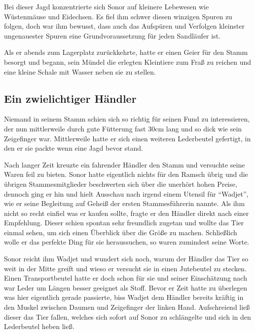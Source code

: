 \documentclass[a4paper]{scrreprt}
\begin{document}
	Bei dieser Jagd konzentrierte sich Sonor auf kleinere Lebewesen wie Wüstenmäuse und Eidechsen. Es fiel ihm schwer diesen winzigen Spuren zu folgen, doch war ihm bewusst, dass auch das Aufspüren und Verfolgen kleinster ungenauester Spuren eine Grundvoraussetzung für jeden Sandläufer ist.
	
	Als er abends zum Lagerplatz zurückkehrte, hatte er einen Geier für den Stamm besorgt und begann, sein Mündel die erlegten Kleintiere zum Fraß zu reichen und eine kleine Schale mit Wasser neben sie zu stellen. 
	
	\subsection{Ein zwielichtiger Händler}
	Niemand in seinem Stamm schien sich so richtig für seinen Fund zu interessieren, der nun mittlerweile durch gute Fütterung fast 30cm lang und so dick wie sein Zeigefinger war.
	Mittlerweile hatte er sich einen weiteren Lederbeutel gefertigt, in den er sie packte wenn eine Jagd bevor stand.
	
	Nach langer Zeit kreuzte ein fahrender Händler den Stamm und versuchte seine Waren feil zu bieten.
	Sonor hatte eigentlich nichts für den Ramsch übrig und die übrigen Stammesmitglieder beschwerten sich über die unerhört hohen Preise, dennoch ging er hin und hielt Ausschau nach irgend einem Utensil für \enquote{Wadjet}, wie er seine Begleitung auf Geheiß der ersten Stammesführerin nannte.
	Als ihm nicht so recht einfiel was er kaufen sollte, fragte er den Händler direkt nach einer Empfehlung.
	Dieser schien spontan sehr freundlich zugetan und wollte das Tier einmal sehen, um sich einen Überblick über die Größe zu machen. Schließlich wolle er das perfekte Ding für sie heraussuchen, so waren zumindest seine Worte.
	
	Sonor reicht ihm Wadjet und wundert sich noch, warum der Händler das Tier so weit in der Mitte greift und wieso er versucht sie in einen Jutebeutel zu stecken. 
	Einen Transportbeutel hatte er doch schon für sie und seiner Einschätzung nach war Leder um Längen besser geeignet als Stoff.
	Bevor er Zeit hatte zu überlegen was hier eigentlich gerade passierte, biss Wadjet dem Händler bereits kräftig in den Muskel zwischen Daumen und Zeigefinger der linken Hand. Aufschreiend ließ dieser das Tier fallen, welches sich sofort auf Sonor zu schlängelte und sich in den Lederbeutel heben ließ.
	
\end{document}
